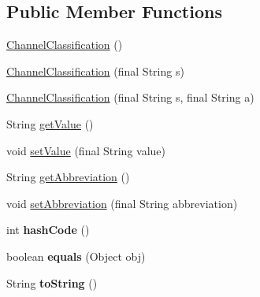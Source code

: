 \subsection*{Public Member Functions}
\begin{DoxyCompactItemize}
\item 
\hyperlink{classgov_1_1fnal_1_1ppd_1_1dd_1_1changer_1_1ChannelClassification_a2e255093510c2aa02327d5444757bf66}{Channel\-Classification} ()
\item 
\hyperlink{classgov_1_1fnal_1_1ppd_1_1dd_1_1changer_1_1ChannelClassification_a56c6ead212681a663a5c3c06bbc58491}{Channel\-Classification} (final String s)
\item 
\hyperlink{classgov_1_1fnal_1_1ppd_1_1dd_1_1changer_1_1ChannelClassification_ad0a87c979cb6ad8f63bf9cb0973dc6b8}{Channel\-Classification} (final String s, final String a)
\item 
String \hyperlink{classgov_1_1fnal_1_1ppd_1_1dd_1_1changer_1_1ChannelClassification_a3ecc2bd9c9c0cbc8df2fdb4c1e8dc794}{get\-Value} ()
\item 
void \hyperlink{classgov_1_1fnal_1_1ppd_1_1dd_1_1changer_1_1ChannelClassification_a975c43d435f30a41b3bcbafa54dd0d56}{set\-Value} (final String value)
\item 
String \hyperlink{classgov_1_1fnal_1_1ppd_1_1dd_1_1changer_1_1ChannelClassification_a587fe4a47a59ece62db68ea68d7a5e68}{get\-Abbreviation} ()
\item 
void \hyperlink{classgov_1_1fnal_1_1ppd_1_1dd_1_1changer_1_1ChannelClassification_a38f17aa3b3c05853fe24e25560ae6524}{set\-Abbreviation} (final String abbreviation)
\item 
\hypertarget{classgov_1_1fnal_1_1ppd_1_1dd_1_1changer_1_1ChannelClassification_a6dbfc4ec668a08ef137a872514303232}{int {\bfseries hash\-Code} ()}\label{classgov_1_1fnal_1_1ppd_1_1dd_1_1changer_1_1ChannelClassification_a6dbfc4ec668a08ef137a872514303232}

\item 
\hypertarget{classgov_1_1fnal_1_1ppd_1_1dd_1_1changer_1_1ChannelClassification_a79f9f40e816a97f3043f096077836e96}{boolean {\bfseries equals} (Object obj)}\label{classgov_1_1fnal_1_1ppd_1_1dd_1_1changer_1_1ChannelClassification_a79f9f40e816a97f3043f096077836e96}

\item 
\hypertarget{classgov_1_1fnal_1_1ppd_1_1dd_1_1changer_1_1ChannelClassification_a9b2bb357ea4192a8c2693fa66a0ce244}{String {\bfseries to\-String} ()}\label{classgov_1_1fnal_1_1ppd_1_1dd_1_1changer_1_1ChannelClassification_a9b2bb357ea4192a8c2693fa66a0ce244}

\end{DoxyCompactItemize}
